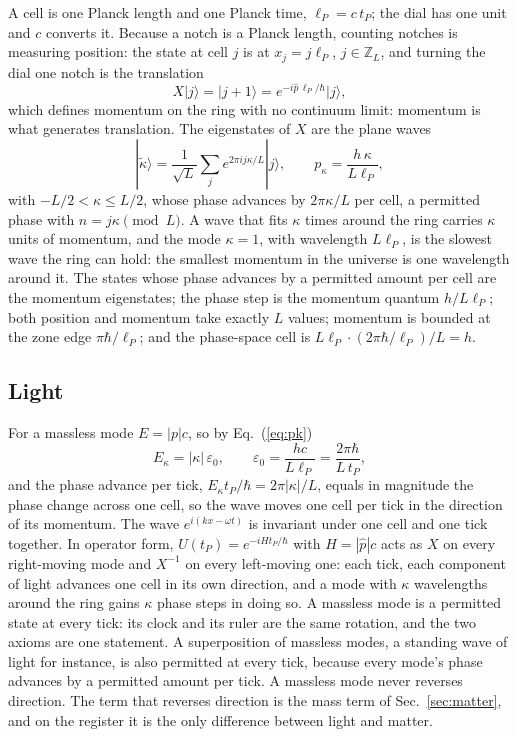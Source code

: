 \documentclass[aps,prd,twocolumn,superscriptaddress,nofootinbib]{revtex4-2}
\begin{document}
A cell is one Planck length and one Planck time, $\ell_P = c\,t_P$; the dial has one unit and $c$ converts it. Because a notch is a Planck length, counting notches is measuring position: the state at cell $j$ is at $x_j = j\ell_P$, $j\in\mathbb{Z}_L$, and turning the dial one notch is the translation
\begin{equation}
X|j\rangle = |j+1\rangle = e^{-i\hat p\,\ell_P/\hbar}|j\rangle ,
\label{eq:X}
\end{equation}
which defines momentum on the ring with no continuum limit: momentum is what generates translation. The eigenstates of $X$ are the plane waves
\begin{equation}
|\tilde\kappa\rangle = \frac{1}{\sqrt L}\sum_j e^{2\pi i j\kappa/L}|j\rangle, \qquad p_\kappa = \frac{h\,\kappa}{L\ell_P},
\label{eq:pk}
\end{equation}
with $-L/2 < \kappa \le L/2$, whose phase advances by $2\pi\kappa/L$ per cell, a permitted phase with $n = j\kappa \pmod L$. A wave that fits $\kappa$ times around the ring carries $\kappa$ units of momentum, and the mode $\kappa = 1$, with wavelength $L\ell_P$, is the slowest wave the ring can hold: the smallest momentum in the universe is one wavelength around it. The states whose phase advances by a permitted amount per cell are the momentum eigenstates; the phase step is the momentum quantum $h/L\ell_P$; both position and momentum take exactly $L$ values; momentum is bounded at the zone edge $\pi\hbar/\ell_P$; and the phase-space cell is $L\ell_P\cdot(2\pi\hbar/\ell_P)/L = h$.

\subsection{Light}
\label{sec:light}

For a massless mode $E = |p|c$, so by Eq.~(\ref{eq:pk})
\begin{equation}
E_\kappa = |\kappa|\,\varepsilon_0, \qquad \varepsilon_0 = \frac{hc}{L\ell_P} = \frac{2\pi\hbar}{L\,t_P},
\label{eq:eps0}
\end{equation}
and the phase advance per tick, $E_\kappa t_P/\hbar = 2\pi|\kappa|/L$, equals in magnitude the phase change across one cell, so the wave moves one cell per tick in the direction of its momentum. The wave $e^{i(kx-\omega t)}$ is invariant under one cell and one tick together. In operator form, $U(t_P) = e^{-iHt_P/\hbar}$ with $H = |\hat p|c$ acts as $X$ on every right-moving mode and $X^{-1}$ on every left-moving one: each tick, each component of light advances one cell in its own direction, and a mode with $\kappa$ wavelengths around the ring gains $\kappa$ phase steps in doing so. A massless mode is a permitted state at every tick: its clock and its ruler are the same rotation, and the two axioms are one statement. A superposition of massless modes, a standing wave of light for instance, is also permitted at every tick, because every mode's phase advances by a permitted amount per tick. A massless mode never reverses direction. The term that reverses direction is the mass term of Sec.~\ref{sec:matter}, and on the register it is the only difference between light and matter.
\end{document}
